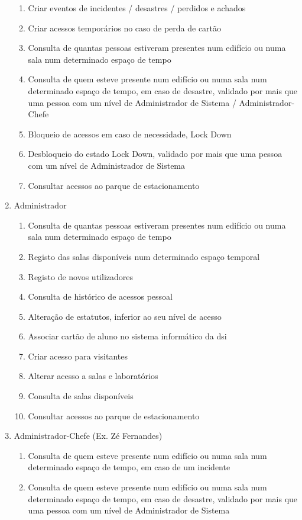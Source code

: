 \documentclass[a4paper]{report}
\begin{document}
\begin{enumerate}
\begin{enumerate}
    \item Criar eventos de incidentes / desastres / perdidos e achados
    \item Criar acessos temporários no caso de perda de cartão
	\item Consulta de quantas pessoas estiveram presentes num edifício ou numa sala num determinado espaço de tempo
    \item Consulta de quem esteve presente num edifício ou numa sala num determinado espaço de tempo, em caso de desastre, validado por mais que uma pessoa com um nível de Administrador de Sistema / Administrador-Chefe
    \item Bloqueio de acessos em caso de necessidade, Lock Down
    \item Desbloqueio do estado Lock Down, validado por mais que uma pessoa com um nível de Administrador de Sistema
    \item Consultar acessos ao parque de estacionamento
	\end{enumerate}
\item Administrador
	\begin{enumerate}
    \item Consulta de quantas pessoas estiveram presentes num edifício ou numa sala num determinado espaço de tempo
    \item Registo das salas disponíveis num determinado espaço temporal
    \item Registo de novos utilizadores
	\item Consulta de histórico de acessos pessoal
    \item Alteração de estatutos, inferior ao seu nível de acesso
    \item Associar cartão de aluno no sistema informático da dsi
    \item Criar acesso para visitantes
    \item Alterar acesso a salas e laboratórios
    \item Consulta de salas disponíveis
    \item Consultar acessos ao parque de estacionamento
    \end{enumerate}
\item Administrador-Chefe (Ex. Zé Fernandes)
	\begin{enumerate}
	\item Consulta de quem esteve presente num edifício ou numa sala num determinado espaço de tempo, em caso de um incidente
    \item Consulta de quem esteve presente num edifício ou numa sala num determinado espaço de tempo, em caso de desastre, validado por mais que uma pessoa com um nível de Administrador de Sistema

\end{enumerate}
\end{enumerate}
\end{document}
